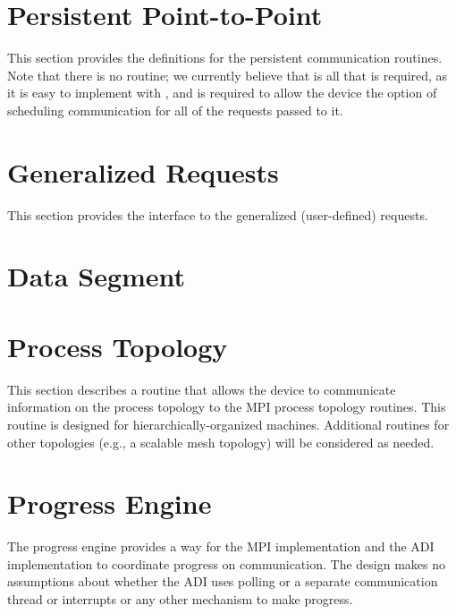 \documentclass{article}
\begin{document}
\section{Persistent Point-to-Point}
\label{sec:persistent}
This section provides the definitions for the persistent communication
routines.  Note that there is no  routine; we
currently believe that  is all that is required,
as it is easy to implement  with ,
and  is required to allow the device the option of
scheduling communication for all of the requests passed to it.







\section{Generalized Requests}
\label{sec:grequests}
This section provides the interface to the generalized (user-defined)
requests.  

%

\section{Data Segment}
\label{sec:segment-fcns}


\section{Process Topology}
This section describes a routine that allows the device to communicate
information on the process topology to the MPI process topology
routines.  This routine is designed for hierarchically-organized
machines.  Additional routines for other topologies (e.g., a scalable
mesh topology) will be considered as needed.



\section{Progress Engine}
\label{sec:progress}
The progress engine provides a way for the MPI implementation and the
ADI implementation to coordinate progress on communication.  The
design makes no assumptions about whether the ADI uses polling or a
separate communication thread or interrupts or any other mechanism to
make progress.  
\end{document}
